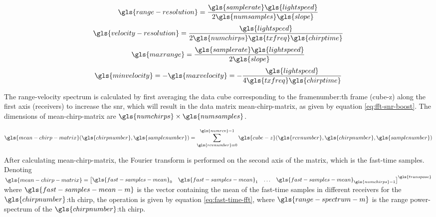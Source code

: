 \begin{equation}
    \label{eq:2dfft-range-resolution}
    \gls{range-resolution} = \frac{\gls{samplerate} \gls{lightspeed}}{2\gls{numsamples}\gls{slope}}
\end{equation}
\begin{equation}
    \label{eq:2dfft-velocity-resolution}
    \gls{velocity-resolution} = \frac{\gls{lightspeed}}{2 \gls{numchirps} \gls{txfreq} \gls{chirptime}}
\end{equation}
\begin{equation}
    \label{eq:2dfft-max-range}
    \gls{maxrange} = \frac{\gls{samplerate} \gls{lightspeed}}{2 \gls{slope}}
\end{equation}
\begin{equation}
    \label{eq:2dfft-min-max-velocity}
    \gls{minvelocity} = -\gls{maxvelocity} = - \frac{\gls{lightspeed}}{4 \gls{txfreq} \gls{chirptime}} \\
\end{equation}

The range-velocity spectrum is calculated by first averaging the data
cube corresponding to the \gls{framenumber}:th frame (\gls{cube-z})
along the first axis (receivers) to increase the \gls{snr},
which will result in the data matrix \gls{mean-chirp-matrix}, as given by equation \ref{eq:fft-snr-boost}.
The dimensions of \gls{mean-chirp-matrix} are $\gls{numchirps} \times \gls{numsamples}$.

\begin{equation}
    \label{eq:fft-snr-boost}
    \gls{mean-chirp-matrix}(\gls{chirpnumber}, \gls{samplenumber}) = \sum \limits_{\gls{rcvnumber} = 0}^{\gls{numrcv}-1} \gls{cube-z}(\gls{rcvnumber}, \gls{chirpnumber}, \gls{samplenumber})
\end{equation}

After calculating \gls{mean-chirp-matrix}, the Fourier transform is performed on the second axis of the matrix,
which is the fast-time samples. Denoting $\gls{mean-chirp-matrix} = \begin{bmatrix} \gls{fast-samples-mean}_{0} & \gls{fast-samples-mean}_{1} & \ldots & \gls{fast-samples-mean}_{\gls{numchirps}-1} \end{bmatrix}^{\gls{transpose}}$ where $\gls{fast-samples-mean-m}$ is the vector containing the mean of the fast-time samples in different receivers
for the $\gls{chirpnumber}$:th chirp,
the operation is given by equation \ref{eq:fast-time-fft},
where $\gls{range-spectrum-m}$ is the range power-spectrum of the $\gls{chirpnumber}$:th chirp.

